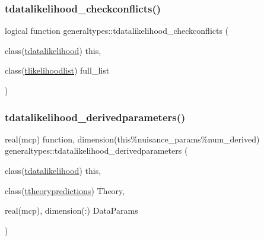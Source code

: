 \mbox{\label{namespacegeneraltypes_a07c63d132f04e331ccb42e8f96080129}} 
\subsubsection{\texorpdfstring{tdatalikelihood\+\_\+checkconflicts()}{tdatalikelihood\_checkconflicts()}}
{\footnotesize\ttfamily logical function generaltypes\+::tdatalikelihood\+\_\+checkconflicts (\begin{DoxyParamCaption}\item[{class(\mbox{\hyperlink{structgeneraltypes_1_1tdatalikelihood}{tdatalikelihood}})}]{this,  }\item[{class(\mbox{\hyperlink{structgeneraltypes_1_1tlikelihoodlist}{tlikelihoodlist}})}]{full\+\_\+list }\end{DoxyParamCaption})\hspace{0.3cm}{\ttfamily [private]}}

\mbox{\label{namespacegeneraltypes_a6bb9fb37002b4265a3a4f438c4b045fa}} 
\subsubsection{\texorpdfstring{tdatalikelihood\+\_\+derivedparameters()}{tdatalikelihood\_derivedparameters()}}
{\footnotesize\ttfamily real(mcp) function, dimension(this\%nuisance\+\_\+params\%num\+\_\+derived) generaltypes\+::tdatalikelihood\+\_\+derivedparameters (\begin{DoxyParamCaption}\item[{class(\mbox{\hyperlink{structgeneraltypes_1_1tdatalikelihood}{tdatalikelihood}})}]{this,  }\item[{class(\mbox{\hyperlink{structgeneraltypes_1_1ttheorypredictions}{ttheorypredictions}})}]{Theory,  }\item[{real(mcp), dimension(\+:)}]{Data\+Params }\end{DoxyParamCaption})\hspace{0.3cm}{\ttfamily [private]}}

